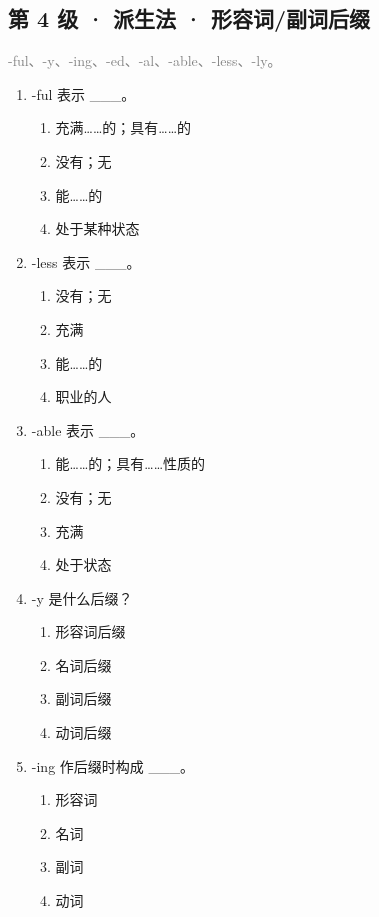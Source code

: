 \documentclass[11pt,a4paper]{ctexart}
\begin{document}
\subsection*{第 4 级 · 派生法 · 形容词/副词后缀}
\noindent\textcolor{gray}{-ful、-y、-ing、-ed、-al、-able、-less、-ly。}\par\smallskip
\begin{enumerate}[leftmargin=*,itemsep=4pt]
\item -ful 表示 \_\_\_。
\begin{enumerate}[label=\Alph*.,leftmargin=2em,itemsep=1pt,topsep=2pt]
\item 充满……的；具有……的
\item 没有；无
\item 能……的
\item 处于某种状态
\end{enumerate}
\item -less 表示 \_\_\_。
\begin{enumerate}[label=\Alph*.,leftmargin=2em,itemsep=1pt,topsep=2pt]
\item 没有；无
\item 充满
\item 能……的
\item 职业的人
\end{enumerate}
\item -able 表示 \_\_\_。
\begin{enumerate}[label=\Alph*.,leftmargin=2em,itemsep=1pt,topsep=2pt]
\item 能……的；具有……性质的
\item 没有；无
\item 充满
\item 处于状态
\end{enumerate}
\item -y 是什么后缀？
\begin{enumerate}[label=\Alph*.,leftmargin=2em,itemsep=1pt,topsep=2pt]
\item 形容词后缀
\item 名词后缀
\item 副词后缀
\item 动词后缀
\end{enumerate}
\item -ing 作后缀时构成 \_\_\_。
\begin{enumerate}[label=\Alph*.,leftmargin=2em,itemsep=1pt,topsep=2pt]
\item 形容词
\item 名词
\item 副词
\item 动词

\end{enumerate}
\end{enumerate}
\end{document}
